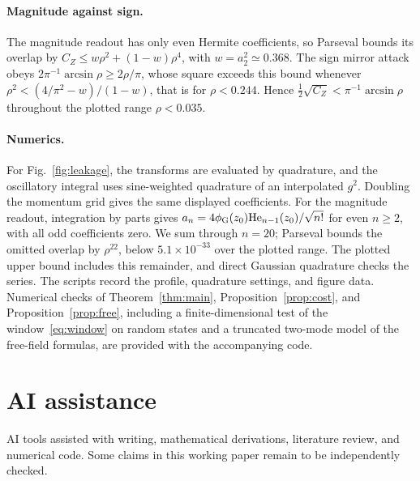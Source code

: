 \documentclass[11pt,a4paper]{article}
\begin{document}
\paragraph*{Magnitude against sign.} The magnitude readout has only even Hermite coefficients, so Parseval bounds its overlap by $C_Z\le w\rho^2+(1-w)\rho^4$, with $w=a_2^2\simeq0.368$. The sign mirror attack obeys $2\pi^{-1}\arcsin\rho\ge2\rho/\pi$, whose square exceeds this bound whenever $\rho^2<(4/\pi^2-w)/(1-w)$, that is for $\rho<0.244$. Hence $\frac12\sqrt{C_Z}<\pi^{-1}\arcsin\rho$ throughout the plotted range $\rho<0.035$.

\paragraph*{Numerics.} For Fig.~\ref{fig:leakage}, the transforms are evaluated by quadrature, and the oscillatory integral uses sine-weighted quadrature of an interpolated $g^2$. Doubling the momentum grid gives the same displayed coefficients. For the magnitude readout, integration by parts gives $a_n=4\phi_{\rm G}(z_0)\mathrm{He}_{n-1}(z_0)/\sqrt{n!}$ for even $n\ge2$, with all odd coefficients zero. We sum through $n=20$; Parseval bounds the omitted overlap by $\rho^{22}$, below $5.1\times10^{-33}$ over the plotted range. The plotted upper bound includes this remainder, and direct Gaussian quadrature checks the series. The scripts record the profile, quadrature settings, and figure data. Numerical checks of Theorem~\ref{thm:main}, Proposition~\ref{prop:cost}, and Proposition~\ref{prop:free}, including a finite-dimensional test of the window~\eqref{eq:window} on random states and a truncated two-mode model of the free-field formulas, are provided with the accompanying code.

\section*{AI assistance}
AI tools assisted with writing, mathematical derivations, literature review, and numerical code. Some claims in this working paper remain to be independently checked.



\end{document}
